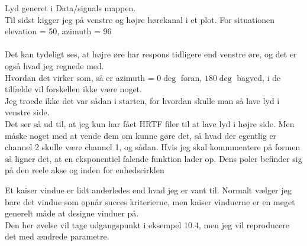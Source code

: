 \begin{Øvelser}
\begin{kapitel}
        \begin{Øvelse}
            Lyd generet i Data/signals mappen.\\
            Til sidst kigger jeg på venstre og højre hørekanal i et plot. For situationen elevation = 50, azimuth = 96
            \\\\
            Det kan tydeligt ses, at højre øre har respons tidligere end venstre øre, og det er også hvad jeg regnede med. \\
            Hvordan det virker som, så er azimuth = $0\deg$ foran, $180\deg$ bagved, i de tilfælde vil forskellen ikke være noget. \\
            Jeg troede ikke det var sådan i starten, for hvordan skulle man så lave lyd i venstre side.\\
            Det ser så ud til, at jeg kun har fået HRTF filer til at lave lyd i højre side.
            Men måske noget med at vende dem om kunne gøre det, så hvad der egentlig er channel 2 skulle være channel 1, og sådan.\clearpage
            Hvis jeg skal kommmentere på formen så ligner det, at en eksponentiel falende funktion lader op. 
            Dens poler befinder sig på den reele akse og inden for enhedscirklen
        \end{Øvelse}
    \end{kapitel}
    \begin{kapitel}[Sampling]
    \end{kapitel}
    \begin{kapitel}
    \end{kapitel}
    \begin{kapitel}
    \end{kapitel}
    \begin{kapitel}
    \end{kapitel}
    \begin{kapitel}
        \begin{Øvelse} 
            Et kaiser vindue er lidt anderledes end hvad jeg er vant til. Normalt vælger jeg bare det vindue som opnår succes kriterierne,
            men kaiser vinduerne er en meget generelt måde at designe vinduer på.\\
            Den her øvelse vil tage udgangspunkt i eksempel 10.4, men jeg vil reproducere det med ændrede parametre. 

\end{Øvelse}
\end{kapitel}
\end{Øvelser}
